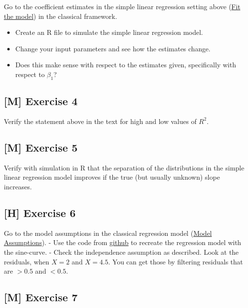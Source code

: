 \documentclass[
]{book}
\providecommand{\tightlist}{%
  \setlength{\itemsep}{0pt}\setlength{\parskip}{0pt}}
\begin{document}
Go to the coefficient estimates in the simple linear regression setting
above (\hyperref[fit_model_simple_lin_reg_classic]{Fit the model})
in the classical framework.

\begin{itemize}
\tightlist
\item
  Create an R file to simulate the simple linear regression model.
\item
  Change your input parameters and see how the estimates change.
\item
  Does this make sense with respect to the estimates given, specifically with respect
  to \(\beta_1\)?
\end{itemize}

\subsection{{[}M{]} Exercise 4}\label{exercise4_simpl_lin_reg}

Verify the statement above in the text for high and low values of \(R^2\).

\subsection{{[}M{]} Exercise 5}\label{exercise5_simpl_lin_reg}

Verify with simulation in R that the separation of the distributions in the simple linear regression model
improves if the true (but usually unknown) slope increases.

\subsection{{[}H{]} Exercise 6}\label{exercise6_simpl_lin_reg}

Go to the model assumptions in the classical regression model (\hyperref[_model_assumptions]{Model Assumptions}).
- Use the code from \href{https://github.com/jdegenfellner/Script_QM2_ZHAW/blob/main/02-Simple_Linear_Regression.Rmd}{github}
to recreate the regression model with the sine-curve.
- Check the independence assumption as described. Look at the residuals, when \(X=2\) and \(X=4.5\).
You can get those by filtering residuals that are \(>0.5\) and \(<0.5\).

\subsection{{[}M{]} Exercise 7}\label{exercise7_simpl_lin_reg}
\end{document}
